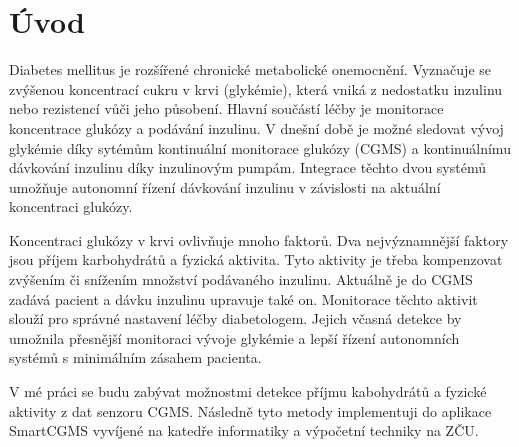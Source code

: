 \chapter{Úvod}

Diabetes mellitus je rozšířené chronické metabolické onemocnění. Vyznačuje se zvýšenou koncentrací cukru v krvi (glykémie), která vniká z nedostatku inzulinu nebo rezistencí vůči jeho působení. Hlavní součástí léčby je monitorace koncentrace glukózy a podávání inzulinu. V dnešní době je možné sledovat vývoj glykémie díky sytémům kontinuální monitorace glukózy (CGMS) a kontinuálnímu dávkování inzulinu díky inzulinovým pumpám. Integrace těchto dvou systémů umožňuje autonomní řízení dávkování inzulinu v závislosti na aktuální koncentraci glukózy.

Koncentraci glukózy v krvi ovlivňuje mnoho faktorů. Dva nejvýznamnější faktory jsou příjem karbohydrátů a fyzická aktivita. Tyto aktivity je třeba kompenzovat zvýšením či snížením množství podávaného inzulinu. Aktuálně je do CGMS zadává pacient a dávku inzulinu upravuje také on. Monitorace těchto aktivit slouží pro správné nastavení léčby diabetologem. Jejich včasná detekce by umožnila přesnější monitoraci vývoje glykémie a lepší řízení autonomních systémů s minimálním zásahem pacienta.

V mé práci se budu zabývat možnostmi detekce příjmu kabohydrátů a fyzické aktivity z dat senzoru CGMS. Následně tyto metody implementuji do aplikace SmartCGMS vyvíjené na katedře informatiky a výpočetní techniky na ZČU.